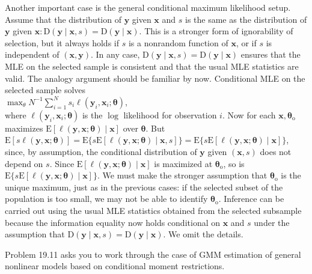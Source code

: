 \documentclass[10pt]{article}
\begin{document}
Another important case is the general conditional maximum likelihood setup. Assume that the distribution of $\mathbf{y}$ given $\mathbf{x}$ and $s$ is the same as the distribution of $\mathbf{y}$ given $\mathbf{x}: \mathrm{D}(\mathbf{y} \mid \mathbf{x}, s)=\mathrm{D}(\mathbf{y} \mid \mathbf{x})$. This is a stronger form of ignorability of selection, but it always holds if $s$ is a nonrandom function of $\mathbf{x}$, or if $s$ is independent of $(\mathbf{x}, \mathbf{y})$. In any case, $\mathrm{D}(\mathbf{y} \mid \mathbf{x}, s)=\mathrm{D}(\mathbf{y} \mid \mathbf{x})$ ensures that the MLE on the selected sample is consistent and that the usual MLE statistics are valid. The analogy argument should be familiar by now. Conditional MLE on the selected sample solves\\
$\max _{\theta} N^{-1} \sum_{i=1}^{N} s_{i} \ell\left(\mathbf{y}_{i}, \mathbf{x}_{i} ; \boldsymbol{\theta}\right)$,\\
where $\ell\left(\mathbf{y}_{i}, \mathbf{x}_{i} ; \boldsymbol{\theta}\right)$ is the $\log$ likelihood for observation $i$. Now for each $\mathbf{x}, \boldsymbol{\theta}_{\mathrm{o}}$ maximizes $\mathrm{E}[\ell(\mathbf{y}, \mathbf{x} ; \boldsymbol{\theta}) \mid \mathbf{x}]$ over $\boldsymbol{\theta}$. But $\mathrm{E}[s \ell(\mathbf{y}, \mathbf{x} ; \boldsymbol{\theta})]=\mathrm{E}\{s \mathrm{E}[\ell(\mathbf{y}, \mathbf{x} ; \boldsymbol{\theta}) \mid \mathbf{x}, s]\}=\mathrm{E}\{s \mathrm{E}[\ell(\mathbf{y}, \mathbf{x} ; \boldsymbol{\theta}) \mid \mathbf{x}]\}$, since, by assumption, the conditional distribution of $\mathbf{y}$ given $(\mathbf{x}, s)$ does not depend on $s$. Since $\mathrm{E}[\ell(\mathbf{y}, \mathbf{x} ; \boldsymbol{\theta}) \mid \mathbf{x}]$ is maximized at $\boldsymbol{\theta}_{\mathrm{o}}$, so is $\mathrm{E}\{s \mathrm{E}[\ell(\mathbf{y}, \mathbf{x} ; \boldsymbol{\theta}) \mid \mathbf{x}]\}$. We must make the stronger assumption that $\boldsymbol{\theta}_{\mathrm{o}}$ is the unique maximum, just as in the previous cases: if the selected subset of the population is too small, we may not be able to identify $\boldsymbol{\theta}_{\mathrm{o}}$. Inference can be carried out using the usual MLE statistics obtained from the selected subsample because the information equality now holds conditional on $\mathbf{x}$ and $s$ under the assumption that $\mathrm{D}(\mathbf{y} \mid \mathbf{x}, s)=\mathrm{D}(\mathbf{y} \mid \mathbf{x})$. We omit the details.

Problem 19.11 asks you to work through the case of GMM estimation of general nonlinear models based on conditional moment restrictions.
\end{document}
